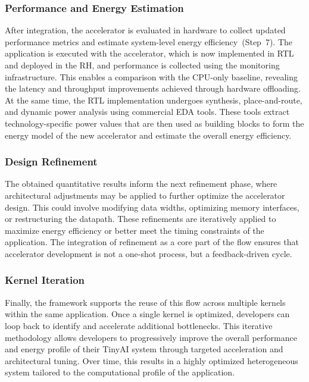             \subsubsection*{Performance and Energy Estimation}
            
                After integration, the accelerator is evaluated in hardware to collect updated performance metrics and estimate system-level energy efficiency~(Step~7). The application is executed with the accelerator, which is now implemented in RTL and deployed in the RH, and performance is collected using the monitoring infrastructure. This enables a comparison with the CPU-only baseline, revealing the latency and throughput improvements achieved through hardware offloading. At the same time, the RTL implementation undergoes synthesis, place-and-route, and dynamic power analysis using commercial EDA tools. These tools extract technology-specific power values that are then used as building blocks to form the energy model of the new accelerator and estimate the overall energy efficiency.
            
            \subsubsection*{Design Refinement}
            
                The obtained quantitative results inform the next refinement phase, where architectural adjustments may be applied to further optimize the accelerator design. This could involve modifying data widths, optimizing memory interfaces, or restructuring the datapath. These refinements are iteratively applied to maximize energy efficiency or better meet the timing constraints of the application. The integration of refinement as a core part of the flow ensures that accelerator development is not a one-shot process, but a feedback-driven cycle.
            
            \subsubsection*{Kernel Iteration}
            
                Finally, the framework supports the reuse of this flow across multiple kernels within the same application. Once a single kernel is optimized, developers can loop back to identify and accelerate additional bottlenecks. This iterative methodology allows developers to progressively improve the overall performance and energy profile of their TinyAI system through targeted acceleration and architectural tuning. Over time, this results in a highly optimized heterogeneous system tailored to the computational profile of the application.
            
